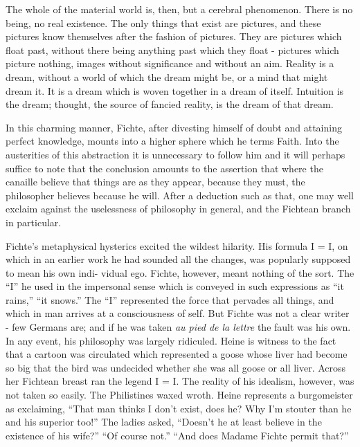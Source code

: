 \documentclass[]{book}
\begin{document}
The whole of the material world is, then, but a cerebral phenomenon.
There is no being, no real existence. The only things that exist are
pictures, and these pictures know themselves after the fashion of
pictures. They are pictures which float past, without there being
anything past which they float - pictures which picture nothing, images
without significance and without an aim. Reality is a dream, without a
world of which the dream might be, or a mind that might dream it. It is
a dream which is woven together in a dream of itself. Intuition is the
dream; thought, the source of fancied reality, is the dream of that
dream.

In this charming manner, Fichte, after divesting himself of doubt and
attaining perfect knowledge, mounts into a higher sphere which he terms
Faith. Into the austerities of this abstraction it is unnecessary to
follow him and it will perhaps suffice to note that the conclusion
amounts to the assertion that where the canaille believe that things are
as they appear, because they must, the philosopher believes because he
will. After a deduction such as that, one may well exclaim against the
uselessness of philosophy in general, and the Fichtean branch in
particular.

Fichte's metaphysical hysterics excited the wildest hilarity. His
formula I = I, on which in an earlier work he had sounded all the
changes, was popularly supposed to mean his own indi- vidual ego.
Fichte, however, meant nothing of the sort. The ``I'' he used in the
impersonal sense which is conveyed in such expressions as ``it rains,''
``it snows.'' The ``I'' represented the force that pervades all things,
and which in man arrives at a consciousness of self. But Fichte was not
a clear writer - few Germans are; and if he was taken \emph{au pied de
la lettre} the fault was his own. In any event, his philosophy was
largely ridiculed. Heine is witness to the fact that a cartoon was
circulated which represented a goose whose liver had become so big that
the bird was undecided whether she was all goose or all liver. Across
her Fichtean breast ran the legend I = I. The reality of his idealism,
however, was not taken so easily. The Philistines waxed wroth. Heine
represents a burgomeister as exclaiming, ``That man thinks I don't
exist, does he? Why I'm stouter than he and his superior too!'' The
ladies asked, ``Doesn't he at least believe in the existence of his
wife?'' ``Of course not.'' ``And does Madame Fichte permit that?''
\end{document}
